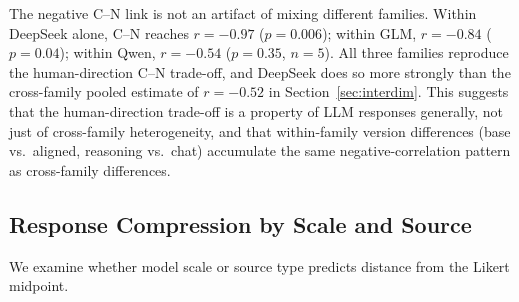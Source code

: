 \documentclass[11pt]{article}
\begin{document}
The negative C--N link is not an artifact of mixing different families.
Within DeepSeek alone, C--N reaches $r = -0.97$ ($p = 0.006$); within GLM, $r = -0.84$ ($p = 0.04$); within Qwen, $r = -0.54$ ($p = 0.35$, $n = 5$).
All three families reproduce the human-direction C--N trade-off, and DeepSeek does so more strongly than the cross-family pooled estimate of $r = -0.52$ in Section~\ref{sec:interdim}.
This suggests that the human-direction trade-off is a property of LLM responses generally, not just of cross-family heterogeneity, and that within-family version differences (base vs.\ aligned, reasoning vs.\ chat) accumulate the same negative-correlation pattern as cross-family differences.

\subsection{Response Compression by Scale and Source}

We examine whether model scale or source type predicts distance from the Likert midpoint.

\begin{table}[!htb]
\centering
\caption{Response compression by subgroup. Distance = mean $|score - 3.0|$ across 8 dimensions. Lower distance indicates stronger compression toward the midpoint.}
\label{tab:subgroup_compression}
\end{table}
\end{document}

